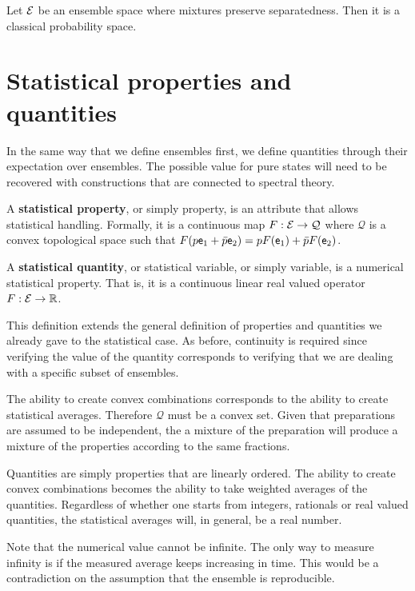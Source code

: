 \begin{conj}
	Let $\mathcal{E}$ be an ensemble space where mixtures preserve separatedness. Then it is a classical probability space.
\end{conj}




\section{Statistical properties and quantities}

In the same way that we define ensembles first, we define quantities through their expectation over ensembles. The possible value for pure states will need to be recovered with constructions that are connected to spectral theory.

\begin{defn}
	A \textbf{statistical property}, or simply property, is an attribute that allows statistical handling. Formally, it is a continuous map $F : \mathcal{E} \to \mathcal{Q}$ where $\mathcal{Q}$ is a convex topological space such that $F(p \mathsf{e}_1 + \bar{p} \mathsf{e}_2) = p F(\mathsf{e}_1) + \bar{p} F(\mathsf{e}_2)$.
	
	A \textbf{statistical quantity}, or statistical variable, or simply variable, is a numerical statistical property. That is, it is a continuous linear real valued operator $F : \mathcal{E} \to \mathbb{R}$.
\end{defn}

\begin{justification}
	This definition extends the general definition of properties and quantities we already gave to the statistical case. As before, continuity is required since verifying the value of the quantity corresponds to verifying that we are dealing with a specific subset of ensembles.
	
	The ability to create convex combinations corresponds to the ability to create statistical averages. Therefore $\mathcal{Q}$ must be a convex set. Given that preparations are assumed to be independent, the a mixture of the preparation will produce a mixture of the properties according to the same fractions. 
	
	Quantities are simply properties that are linearly ordered. The ability to create convex combinations becomes the ability to take weighted averages of the quantities. Regardless of whether one starts from integers, rationals or real valued quantities, the statistical averages will, in general, be a real number.
	
	Note that the numerical value cannot be infinite. The only way to measure infinity is if the measured average keeps increasing in time. This would be a contradiction on the assumption that the ensemble is reproducible.
\end{justification}

